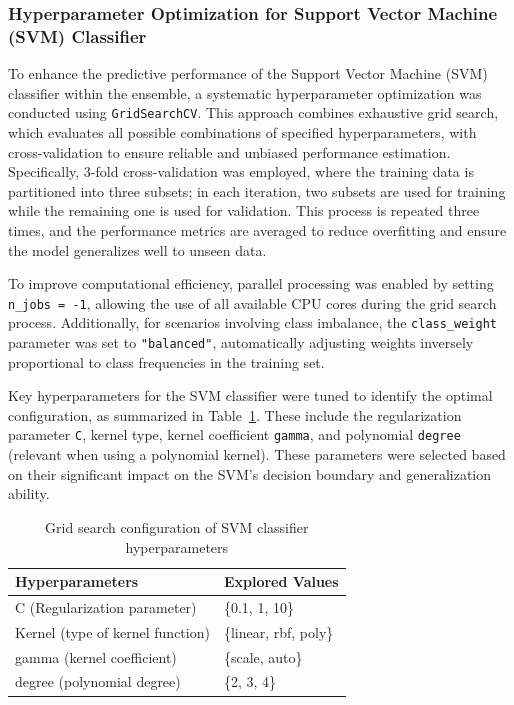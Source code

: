 \subsubsection{Hyperparameter Optimization for Support Vector Machine (SVM) Classifier}

To enhance the predictive performance of the Support Vector Machine (SVM) classifier within the ensemble, a systematic hyperparameter optimization was conducted using \texttt{GridSearchCV}. This approach combines exhaustive grid search, which evaluates all possible combinations of specified hyperparameters, with cross-validation to ensure reliable and unbiased performance estimation. Specifically, 3-fold cross-validation was employed, where the training data is partitioned into three subsets; in each iteration, two subsets are used for training while the remaining one is used for validation. This process is repeated three times, and the performance metrics are averaged to reduce overfitting and ensure the model generalizes well to unseen data.

To improve computational efficiency, parallel processing was enabled by setting \texttt{n\_jobs = -1}, allowing the use of all available CPU cores during the grid search process. Additionally, for scenarios involving class imbalance, the \texttt{class\_weight} parameter was set to \texttt{"balanced"}, automatically adjusting weights inversely proportional to class frequencies in the training set.

Key hyperparameters for the SVM classifier were tuned to identify the optimal configuration, as summarized in Table~\ref{tab:svm_grid}. These include the regularization parameter \texttt{C}, kernel type, kernel coefficient \texttt{gamma}, and polynomial \texttt{degree} (relevant when using a polynomial kernel). These parameters were selected based on their significant impact on the SVM’s decision boundary and generalization ability.

\begin{table}[h]
\centering
\caption{Grid search configuration of SVM classifier hyperparameters}
\begin{tabular}{|p{4.5cm}|p{8.5cm}|}
\hline
\textbf{Hyperparameters} & \textbf{Explored Values} \\
\hline
C (Regularization parameter) & \{0.1, 1, 10\} \\
\hline
Kernel (type of kernel function) & \{linear, rbf, poly\} \\
\hline
gamma (kernel coefficient) & \{scale, auto\} \\
\hline
degree (polynomial degree) & \{2, 3, 4\} \\
\hline
\end{tabular}
\label{tab:svm_grid}
\end{table}

